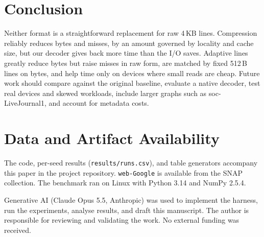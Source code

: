 \documentclass[sigconf,nonacm]{acmart}
\begin{document}
\section{Conclusion}
Neither format is a straightforward replacement for raw 4\,KB lines. Compression reliably reduces bytes and misses, by an amount governed by locality and cache size, but our decoder gives back more time than the I/O saves. Adaptive lines greatly reduce bytes but raise misses in raw form, are matched by fixed 512\,B lines on bytes, and help time only on devices where small reads are cheap.
Future work should compare against the original baseline, evaluate a native decoder, test real devices and skewed workloads, include larger graphs such as soc-LiveJournal1, and account for metadata costs.

\section*{Data and Artifact Availability}
The code, per-seed results (\texttt{results/runs.csv}), and table generators accompany this paper in the project repository. \texttt{web-Google} is available from the SNAP collection. The benchmark ran on Linux with Python 3.14 and NumPy 2.5.4.

\begin{acks}
Generative AI (Claude Opus 5.5, Anthropic) was used to implement the harness, run the experiments, analyse results, and draft this manuscript. The author is responsible for reviewing and validating the work. No external funding was received.
\end{acks}



\end{document}
